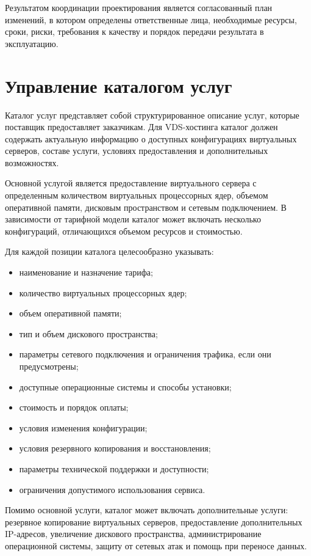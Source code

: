 \documentclass[14pt,a4paper]{extarticle}
\begin{document}
Результатом координации проектирования является согласованный план изменений,
в котором определены ответственные лица, необходимые ресурсы, сроки, риски,
требования к качеству и порядок передачи результата в эксплуатацию.

\section{Управление каталогом услуг}

Каталог услуг представляет собой структурированное описание услуг, которые
поставщик предоставляет заказчикам. Для VDS-хостинга каталог должен содержать
актуальную информацию о доступных конфигурациях виртуальных серверов, составе
услуги, условиях предоставления и дополнительных возможностях.

Основной услугой является предоставление виртуального сервера с определенным
количеством виртуальных процессорных ядер, объемом оперативной памяти, дисковым
пространством и сетевым подключением. В зависимости от тарифной модели каталог
может включать несколько конфигураций, отличающихся объемом ресурсов и стоимостью.

Для каждой позиции каталога целесообразно указывать:
\begin{itemize}
    \item наименование и назначение тарифа;
    \item количество виртуальных процессорных ядер;
    \item объем оперативной памяти;
    \item тип и объем дискового пространства;
    \item параметры сетевого подключения и ограничения трафика, если они
    предусмотрены;
    \item доступные операционные системы и способы установки;
    \item стоимость и порядок оплаты;
    \item условия изменения конфигурации;
    \item условия резервного копирования и восстановления;
    \item параметры технической поддержки и доступности;
    \item ограничения допустимого использования сервиса.
\end{itemize}

Помимо основной услуги, каталог может включать дополнительные услуги: резервное
копирование виртуальных серверов, предоставление дополнительных IP-адресов,
увеличение дискового пространства, администрирование операционной системы,
защиту от сетевых атак и помощь при переносе данных.
\end{document}
